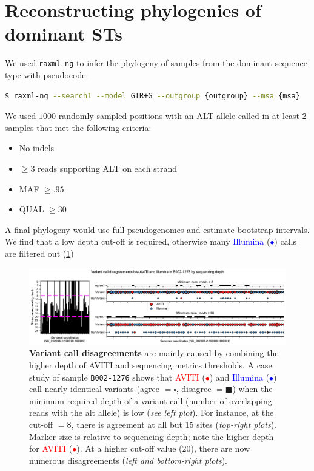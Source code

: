 \documentclass{article}
\begin{document}
\section{Reconstructing phylogenies of dominant STs}

We used \texttt{raxml-ng} to infer the phylogeny of samples from the dominant sequence type with pseudocode:

\begin{lstlisting}[language=bash]
$ raxml-ng --search1 --model GTR+G --outgroup {outgroup} --msa {msa}
\end{lstlisting}

We used $1000$ randomly sampled positions with an ALT allele called in at least 2 samples that met the following criteria:

\begin{itemize}
    \item No indels
    \item $\geq 3$ reads supporting ALT on each strand
    \item MAF $\geq .95$
    \item QUAL $\geq 30$
\end{itemize}

A final phylogeny would use full pseudogenomes and estimate bootstrap intervals. We find that a low depth cut-off is required, otherwise many \textcolor{blue}{Illumina} (\textcolor{blue}{$\bullet$}) 
calls are filtered out (\cref{figure:variant-call-disagree})

\begin{figure}[H]
    \centering
    \includegraphics[width=.95\textwidth]{figures/variant-call-disagree}
    \caption{
        \textbf{Variant call disagreements} are mainly caused by combining the higher depth of AVITI and sequencing metrics thresholds. 
        A case study of sample \texttt{B002-1276} shows that \textcolor{red}{AVITI} (\textcolor{red}{$\bullet$}) and \textcolor{blue}{Illumina} (\textcolor{blue}{$\bullet$}) call nearly
        identical variants (agree $=\square$, disagree $=\blacksquare$) when the minimum required depth of a variant call (number of overlapping reads with the alt allele) is low (\textit{see left plot}).
        For instance, at the cut-off $=8$, there is agreement at all but 15 sites (\textit{top-right plots}). 
        Marker size is relative to sequencing depth; note the higher depth for \textcolor{red}{AVITI} (\textcolor{red}{$\bullet$}). 
        At a higher cut-off value ($20$), there are now numerous disagreements (\textit{left and bottom-right plots}).
    }
    \label{figure:variant-call-disagree}
\end{figure}
\end{document}
